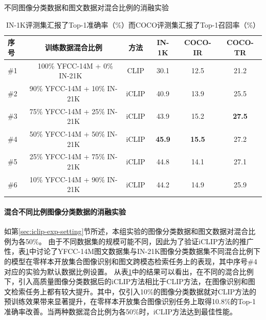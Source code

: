 \begin{table}
    \centering
    \caption{不同图像分类数据和图文数据对混合比例的消融实验}
    \begin{tabular}{lccccc}
    \toprule
        序号 & 训练数据混合比例 & 方法 & IN-1K & COCO-IR & COCO-TR    \\
        \midrule
        \#1 & ~100\% YFCC-14M + 0\% IN-21K ~& CLIP & 30.1 & 12.5 & 21.2  \\

        \#2 & {90\% YFCC-14M + 10\% IN-21K} & iCLIP & 40.9 & 13.9 & 25.5 \\ 

        \#3 & {75\% YFCC-14M + 25\% IN-21K} & iCLIP & 43.9 & 15.2 & \textbf{27.5} \\ 
        
        \#4 & 50\% YFCC-14M + 50\% IN-21K & iCLIP & \textbf{45.9} & \textbf{15.5} & 27.2 \\    
        
        \#5 & {25\% YFCC-14M + 75\% IN-21K} & iCLIP & 44.8 & 14.1 & 27.1 \\  

        \#6 & {10\% YFCC-14M + 90\% IN-21K} & iCLIP & 44.2 & 14.9 & 25.9 \\
        \bottomrule
    \end{tabular}
    \caption*{IN-1K评测集汇报了Top-1准确率（\%）而COCO评测集汇报了Top-1召回率（\%）}
    \label{tab:iclip-ablate_combine}
\end{table}

\paragraph{混合不同比例图像分类数据的消融实验} 如第\ref{sec:iclip-exp-setting}节所述，本组实验的图像分类数据和图文数据对混合比例为各50\%。
由于不同数据集的规模可能不同，因此为了验证iCLIP方法的推广性，表\ref{tab:iclip-ablate_combine}中讨论了YFCC-14M图文数据集与IN-21K图像分类数据集不同混合比例下的模型在零样本开放集合图像识别和图文跨模态检索任务上的表现，其中序号\#4对应的实验为默认数据比例设置。
从表\ref{tab:iclip-ablate_combine}中的结果可以看出，在不同的混合比例下，引入高质量图像分类数据后的iCLIP方法相比于CLIP方法，在图像识别和图文检索任务上都有较大提升。其中，仅引入10\%的图像分类数据就对CLIP方法的预训练效果带来显著提升，在零样本开放集合图像识别任务上取得10.8\%的Top-1准确率改善。当两种数据混合比例为各50\%时，iCLIP方法达到最佳性能。

